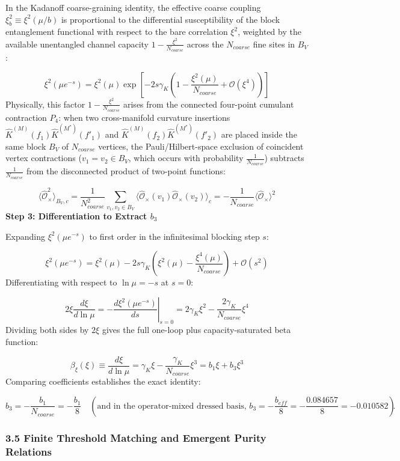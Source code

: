 \documentclass[aps,prd,onecolumn,superscriptaddress,nofootinbib,longbibliography,10pt]{revtex4-2}
\begin{document}
  In the Kadanoff coarse-graining identity, the effective coarse coupling \(\xi_b^2 \equiv \xi^2(\mu/b)\) is proportional to the differential susceptibility of the block entanglement functional with respect to the bare correlation \(\xi^2\), weighted by the available unentangled channel capacity \(1 - \frac{\xi^2}{N_{coarse}}\) across the \(N_{coarse}\) fine sites in \(B_V\):


  \[ \xi^2(\mu e^{-s}) = \xi^2(\mu)\exp\left[ -2s\gamma_K\left(1 - \frac{\xi^2(\mu)}{N_{coarse}} + \mathcal{O}(\xi^4)\right) \right] \]
  Physically, this factor \(1 - \frac{\xi^2}{N_{coarse}}\) arises from the connected four-point cumulant contraction \(P_4\): when two cross-manifold curvature insertions \(\hat{K}^{(M)}(f_1)\hat{K}^{(M^*)}(f'_1)\) and \(\hat{K}^{(M)}(f_2)\hat{K}^{(M^*)}(f'_2)\) are placed inside the same block \(B_V\) of \(N_{coarse}\) vertices, the Pauli/Hilbert-space exclusion of coincident vertex contractions (\(v_1 = v_2 \in B_V\), which occurs with probability \(\frac{1}{N_{coarse}}\)) subtracts \(\frac{1}{N_{coarse}}\) from the disconnected product of two-point functions:


  \[ \langle\hat{\mathcal{O}}_\times^2\rangle_{B_V,c} = \frac{1}{N_{coarse}^2}\sum_{v_1, v_2\in B_V} \langle\hat{\mathcal{O}}_\times(v_1)\hat{\mathcal{O}}_\times(v_2)\rangle_c = -\frac{1}{N_{coarse}}\langle\hat{\mathcal{O}}_\times\rangle^2 \]
  \textbf{Step 3: Differentiation to Extract \(b_3\)}


  Expanding \(\xi^2(\mu e^{-s})\) to first order in the infinitesimal blocking step \(s\):


  \[ \xi^2(\mu e^{-s}) = \xi^2(\mu) - 2s\gamma_K\left(\xi^2(\mu) - \frac{\xi^4(\mu)}{N_{coarse}}\right) + \mathcal{O}(s^2) \]
  Differentiating with respect to \(\ln\mu = -s\) at \(s = 0\):


  \[ 2\xi\frac{d\xi}{d\ln\mu} = -\left.\frac{d\xi^2(\mu e^{-s})}{ds}\right|_{s=0} = 2\gamma_K\xi^2 - \frac{2\gamma_K}{N_{coarse}}\xi^4 \]
  Dividing both sides by \(2\xi\) gives the full one-loop plus capacity-saturated beta function:


  \[ \beta_\xi(\xi) \equiv \frac{d\xi}{d\ln\mu} = \gamma_K\xi - \frac{\gamma_K}{N_{coarse}}\xi^3 = b_1\xi + b_3\xi^3 \]
  Comparing coefficients establishes the exact identity:


  \[ b_3 = -\frac{b_1}{N_{coarse}} = -\frac{b_1}{8} \quad \left(\text{and in the operator-mixed dressed basis, } b_3 = -\frac{b_{eff}}{8} = -\frac{0.084657}{8} = -0.010582\right). \]

  
\subsubsection*{3.5 Finite Threshold Matching and Emergent Purity Relations}
\end{document}
